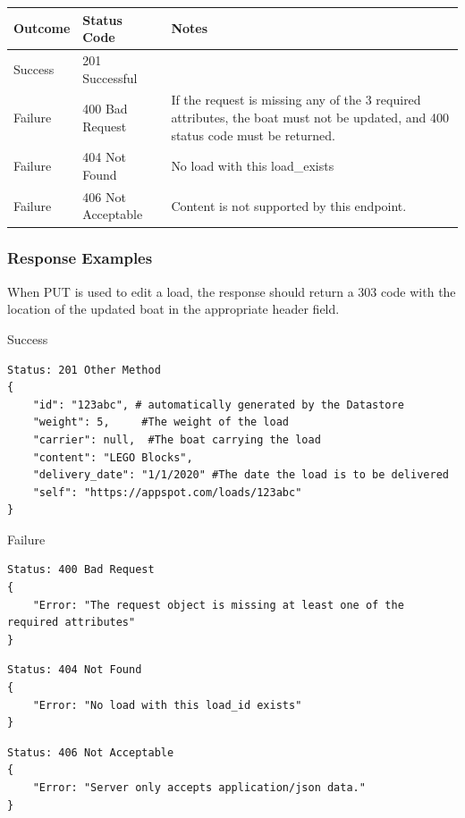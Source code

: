 \documentclass[letterpaper,11pt,titlepage,draftclsnofoot,onecolumn,compsoc,utf8,latin1]{IEEEtran}
\begin{document}
\begin{singlespace}
\begin{center}
\begin{tabular}{ |p{}|p{}|p{}| } 
 \hline
 \textbf{Outcome} & \textbf{Status Code} & \textbf{Notes}  \\  \hline
 Success & 201 Successful & \\ \hline
 Failure & 400 Bad Request &  
 If the request is missing any of the 3 required attributes, the boat must not be updated, and 400 status code must be returned.\\ \hline
 Failure & 404 Not Found & No load with this load_exists \\ \hline
 Failure & 406 Not Acceptable & Content is not supported by this endpoint. \\
 \hline
\end{tabular}
\end{center}

\subsubsection{Response Examples}

When PUT is used to edit a load, the response should return a 303 code with the location of the updated boat in the appropriate header field.

\noindent \Large{Success}

\begin{lstlisting}[]
Status: 201 Other Method
{ 
    "id": "123abc", # automatically generated by the Datastore
    "weight": 5,     #The weight of the load
    "carrier": null,  #The boat carrying the load
    "content": "LEGO Blocks",
    "delivery_date": "1/1/2020" #The date the load is to be delivered
    "self": "https://appspot.com/loads/123abc"
}
\end{lstlisting}

\noindent \Large{Failure}

\begin{lstlisting}[]
Status: 400 Bad Request
{
    "Error: "The request object is missing at least one of the required attributes"
}
\end{lstlisting}

\begin{lstlisting}[]
Status: 404 Not Found
{
    "Error: "No load with this load_id exists"
}
\end{lstlisting}

\begin{lstlisting}[]
Status: 406 Not Acceptable
{
    "Error: "Server only accepts application/json data."
}
\end{lstlisting}


\end{singlespace}
\end{document}
